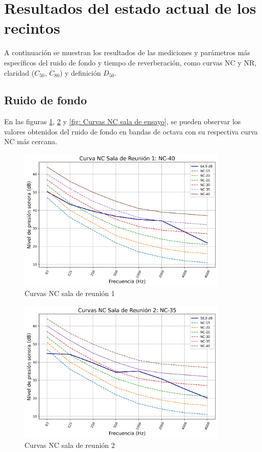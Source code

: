 \section{Resultados del estado actual de los recintos}
A continuación se muestran los resultados de las mediciones y parámetros más específicos del ruido de fondo y tiempo de reverberación, como curvas NC y NR, claridad ($C_{50}$, $C_{80}$) y definición $D_{50}$.
\subsection{Ruido de fondo}
En las figuras \ref{fig: Curvas NC sala 1}, \ref{fig: Curvas NC sala 2} y \ref{fig: Curvas NC sala de ensayo}, se pueden observar los valores obtenidos del ruido de fondo en bandas de octava con su respectiva curva NC más cercana.
    \begin{figure}[H]
        \centering
        \includegraphics[width=10cm]{Imagenes/Resultados/Curvas NC-NR/NC reunion 1.png}
        \caption{Curvas NC sala de reunión 1}
        \label{fig: Curvas NC sala 1}
    \end{figure}

    \begin{figure}[H]
        \centering
        \includegraphics[width=10cm]{Imagenes/Resultados/Curvas NC-NR/NC reunion 2.png}
        \caption{Curvas NC sala de reunión 2}
        \label{fig: Curvas NC sala 2}
    \end{figure}

